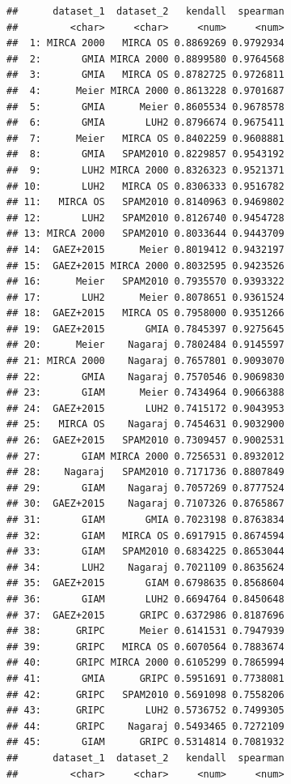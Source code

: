 \documentclass[
  11pt,
]{article}
\begin{document}
\begin{verbatim}
##      dataset_1  dataset_2   kendall  spearman
##         <char>     <char>     <num>     <num>
##  1: MIRCA 2000   MIRCA OS 0.8869269 0.9792934
##  2:       GMIA MIRCA 2000 0.8899580 0.9764568
##  3:       GMIA   MIRCA OS 0.8782725 0.9726811
##  4:      Meier MIRCA 2000 0.8613228 0.9701687
##  5:       GMIA      Meier 0.8605534 0.9678578
##  6:       GMIA       LUH2 0.8796674 0.9675411
##  7:      Meier   MIRCA OS 0.8402259 0.9608881
##  8:       GMIA   SPAM2010 0.8229857 0.9543192
##  9:       LUH2 MIRCA 2000 0.8326323 0.9521371
## 10:       LUH2   MIRCA OS 0.8306333 0.9516782
## 11:   MIRCA OS   SPAM2010 0.8140963 0.9469802
## 12:       LUH2   SPAM2010 0.8126740 0.9454728
## 13: MIRCA 2000   SPAM2010 0.8033644 0.9443709
## 14:  GAEZ+2015      Meier 0.8019412 0.9432197
## 15:  GAEZ+2015 MIRCA 2000 0.8032595 0.9423526
## 16:      Meier   SPAM2010 0.7935570 0.9393322
## 17:       LUH2      Meier 0.8078651 0.9361524
## 18:  GAEZ+2015   MIRCA OS 0.7958000 0.9351266
## 19:  GAEZ+2015       GMIA 0.7845397 0.9275645
## 20:      Meier    Nagaraj 0.7802484 0.9145597
## 21: MIRCA 2000    Nagaraj 0.7657801 0.9093070
## 22:       GMIA    Nagaraj 0.7570546 0.9069830
## 23:       GIAM      Meier 0.7434964 0.9066388
## 24:  GAEZ+2015       LUH2 0.7415172 0.9043953
## 25:   MIRCA OS    Nagaraj 0.7454631 0.9032900
## 26:  GAEZ+2015   SPAM2010 0.7309457 0.9002531
## 27:       GIAM MIRCA 2000 0.7256531 0.8932012
## 28:    Nagaraj   SPAM2010 0.7171736 0.8807849
## 29:       GIAM    Nagaraj 0.7057269 0.8777524
## 30:  GAEZ+2015    Nagaraj 0.7107326 0.8765867
## 31:       GIAM       GMIA 0.7023198 0.8763834
## 32:       GIAM   MIRCA OS 0.6917915 0.8674594
## 33:       GIAM   SPAM2010 0.6834225 0.8653044
## 34:       LUH2    Nagaraj 0.7021109 0.8635624
## 35:  GAEZ+2015       GIAM 0.6798635 0.8568604
## 36:       GIAM       LUH2 0.6694764 0.8450648
## 37:  GAEZ+2015      GRIPC 0.6372986 0.8187696
## 38:      GRIPC      Meier 0.6141531 0.7947939
## 39:      GRIPC   MIRCA OS 0.6070564 0.7883674
## 40:      GRIPC MIRCA 2000 0.6105299 0.7865994
## 41:       GMIA      GRIPC 0.5951691 0.7738081
## 42:      GRIPC   SPAM2010 0.5691098 0.7558206
## 43:      GRIPC       LUH2 0.5736752 0.7499305
## 44:      GRIPC    Nagaraj 0.5493465 0.7272109
## 45:       GIAM      GRIPC 0.5314814 0.7081932
##      dataset_1  dataset_2   kendall  spearman
##         <char>     <char>     <num>     <num>
\end{verbatim}
\end{document}
